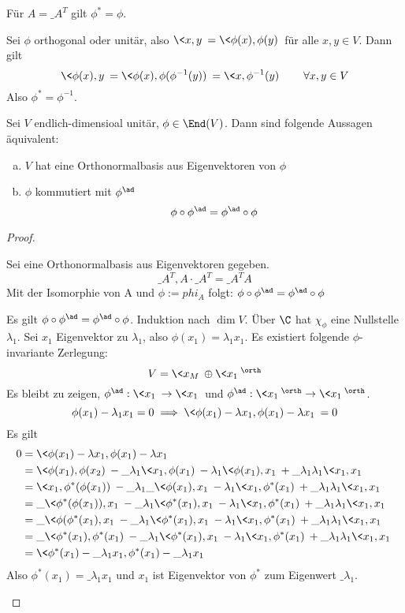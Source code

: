 \documentclass{mycourse}
\begin{document}
\begin{ex}
	Für $A=\_A^T$ gilt $\phi^* = \phi$.

	Sei $\phi$ orthogonal oder unitär, also $\<x,y\> = \<\phi(x),\phi(y)\>$ für alle $x,y\in V$.
	Dann gilt
	\[
		\<\phi(x),y\> = \<\phi(x),\phi(\phi^{-1}(y))\> = \<x, \phi^{-1}(y)\> \qquad \forall x,y\in V
	\]
	Also $\phi^* = \phi^{-1}$.
\end{ex}

\begin{thm}
	\label{thm:13.25}
	Sei $V$ endlich-dimensioal unitär, $\phi\in \End(V)$.
	Dann sind folgende Aussagen äquivalent:
	\begin{enumerate}[(a)]
		\item
			$V$ hat eine Orthonormalbasis aus Eigenvektoren von $\phi$
		\item
			$\phi$ kommutiert mit $\phi^{\ad}$
			\[
				\phi \circ \phi^{\ad} = \phi^{\ad} \circ \phi
			\]
	\end{enumerate}
	\begin{proof}
		\begin{seg}[„$(a)\implies (b)$“]
			Sei eine Orthonormalbasis aus Eigenvektoren gegeben.
			\[
				\_A^T, A\cdot \_A^T = \_A^T A
			\]
			Mit der Isomorphie von A und $\phi:=phi_A$ folgt: $\phi\circ \phi^{\ad} = \phi^{\ad}\circ \phi$
		\end{seg}
		\begin{seg}[„$(b)\implies (a)$“]
			Es gilt $\phi \circ \phi^{\ad} = \phi^{\ad}\circ \phi$.
			Induktion nach $\dim V$.
			Über $\C$ hat $\chi_\phi$ eine Nullstelle $\lambda_1$.
			Sei $x_1$ Eigenvektor zu $\lambda_1$, also $\phi(x_1) = \lambda_1 x_1$.
			Es existiert folgende $\phi$-invariante Zerlegung:
			\[
				V = \<x_M\>  \oplus \<x_1\>^\orth
			\]
			Es bleibt zu zeigen, $\phi^{\ad}: \<x_1\> \to \<x_1\>$ und $\phi^{\ad}: \<x_1\>^\orth \to \<x_1\>^\orth$.
			\[
				\phi(x_1) -\lambda_1 x_1 = 0 \implies \<\phi(x_1)-\lambda x_1, \phi(x_1) - \lambda x_1\> = 0
			\]
			Es gilt
			\begin{align*}
				0 &= \<\phi(x_1)-\lambda x_1, \phi(x_1) - \lambda x_1\> \\
				  &= \<\phi(x_1),\phi(x_2)\> - \_\lambda_1 \<x_1,\phi(x_1)\> - \lambda_1 \<\phi(x_1), x_1\> + \_\lambda_1\lambda_1\<x_1,x_1\>\\
				  &= \<x_1,\phi^*(\phi(x_1))\> - \_\lambda_1\_{\<\phi(x_1),x_1\>} - \lambda_1\<x_1,\phi^*(x_1)\> + \_\lambda_1\lambda_1 \<x_1,x_1\>\\
				  &= \_{\<\phi^*(\phi(x_1)),x_1\>} - \_\lambda_1 \<\phi^*(x_1),x_1\> - \lambda_1\<x_1,\phi^*(x_1)\> + \_\lambda_1\lambda_1 \<x_1,x_1\>\\
				  &= \_{\<\phi(\phi^*(x_1),x_1\>} - \_\lambda_1\<\phi^*(x_1),x_1\> - \lambda_1\<x_1,\phi^*(x_1)\> + \_\lambda_1\lambda_1\<x_1,x_1\>\\
				  &= \_{\<\phi^*(x_1),\phi^*(x_1)\>} - \_\lambda_1 \<\phi^*(x_1),x_1\> - \lambda_1 \<x_1,\phi^*(x_1)\> + \_\lambda_1\lambda_1 \<x_1,x_1\>\\
				  &= \<\phi^*(x_1)-\_\lambda_1x_1, \phi^*(x_1)-\_\lambda_1x_1\>
			\end{align*}
			Also $\phi^*(x_1) = \_\lambda_1 x_1$ und $x_1$ ist Eigenvektor von $\phi^*$ zum Eigenwert $\_\lambda_1$.


\end{seg}
\end{proof}
\end{thm}
\end{document}
